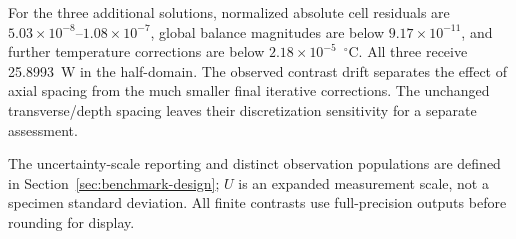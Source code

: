 \documentclass[preprint,12pt]{elsarticle}
\begin{document}
For the three additional solutions, normalized absolute cell residuals are $5.03\times10^{-8}$--$1.08\times10^{-7}$, global balance magnitudes are below $9.17\times10^{-11}$, and further temperature corrections are below $2.18\times10^{-5}$~$^\circ$C. All three receive 25.8993~W in the half-domain. The observed contrast drift separates the effect of axial spacing from the much smaller final iterative corrections. The unchanged transverse/depth spacing leaves their discretization sensitivity for a separate assessment.

The uncertainty-scale reporting and distinct observation populations are defined in Section~\ref{sec:benchmark-design}; $U$ is an expanded measurement scale, not a specimen standard deviation. All finite contrasts use full-precision outputs before rounding for display.

\clearpage


\end{document}
